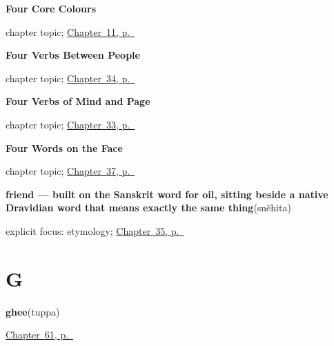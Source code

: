 \noindent\begin{minipage}[t]{\linewidth}
\raggedright
\textbf{Four Core Colours}\par
\footnotesize chapter topic; \hyperref[ch:ka-core-colours]{Chapter~11, p.~\pageref*{ch:ka-core-colours}}
\end{minipage}\par\smallskip

\noindent\begin{minipage}[t]{\linewidth}
\raggedright
\textbf{Four Verbs Between People}\par
\footnotesize chapter topic; \hyperref[ch:ka-social-verbs]{Chapter~34, p.~\pageref*{ch:ka-social-verbs}}
\end{minipage}\par\smallskip

\noindent\begin{minipage}[t]{\linewidth}
\raggedright
\textbf{Four Verbs of Mind and Page}\par
\footnotesize chapter topic; \hyperref[ch:ka-mind-verbs]{Chapter~33, p.~\pageref*{ch:ka-mind-verbs}}
\end{minipage}\par\smallskip

\noindent\begin{minipage}[t]{\linewidth}
\raggedright
\textbf{Four Words on the Face}\par
\footnotesize chapter topic; \hyperref[ch:ka-face-words]{Chapter~37, p.~\pageref*{ch:ka-face-words}}
\end{minipage}\par\smallskip

\noindent\begin{minipage}[t]{\linewidth}
\raggedright
\textbf{friend — built on the Sanskrit word for oil, sitting beside a native Dravidian word that means exactly the same thing}\enspace\emph{}\enspace(snēhita)\par
\footnotesize explicit focus: etymology; \hyperref[ch:ka-family-and-friends]{Chapter~35, p.~\pageref*{ch:ka-family-and-friends}}
\end{minipage}\par\smallskip

\section*{G}

\noindent\begin{minipage}[t]{\linewidth}
\raggedright
\textbf{ghee}\enspace\emph{}\enspace(tuppa)\par
\footnotesize \hyperref[ch:ka-kitchen]{Chapter~61, p.~\pageref*{ch:ka-kitchen}}
\end{minipage}\par\smallskip

